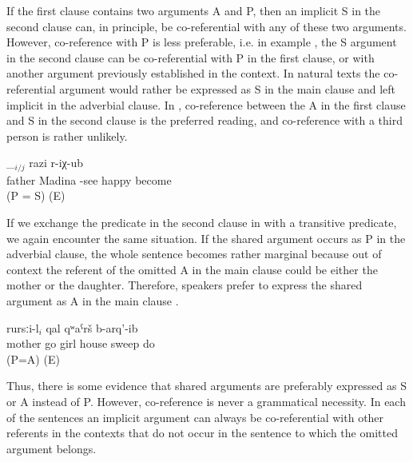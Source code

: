 If the first clause contains two arguments A and P, then an implicit S in the second clause can, in principle, be co-referential with any of these two arguments. However, co-reference with P is less preferable, i.e. in example , the S argument in the second clause can be co-referential with P in the first clause, or with another argument previously established in the context. In natural texts the co-referential argument would rather be expressed as S in the main clause and left implicit in the adverbial clause. In , co-reference between the A in the first clause and S in the second clause is the preferred reading, and co-reference with a third person is rather unlikely. 
%
\begin{exe}
	\ex	\label{ex:Father saw Madina and (she) got happy@40}
		\_$_{i/j}$	razi	r-iχ-ub\\
		father 	Madina	-see		happy	become\\
	\glt	{} (P = S) (E)
\end{exe}

If we exchange the predicate in the second clause in  with a transitive predicate, we again encounter the same situation. If the shared argument occurs as P in the adverbial clause, the whole sentence becomes rather marginal because out of context the referent of the omitted A in the main clause could be either the mother or the daughter. Therefore, speakers prefer to express the shared argument as A in the main clause .
%
 \begin{exe}
	\ex	\label{ex:Mother called her daughter and she swept the house@41}
	\gll	[aba-l	\_$_{i}$ až-aq-ur-re]	rursːi-l$_{i}$	qal	qʷaˁrš b-arq'-ib\\
		mother 	go	girl	house	sweep do\\
	\glt	{} (P=A) (E)
\end{exe}

Thus, there is some evidence that shared arguments are preferably expressed as S or A instead of P. However, co-reference is never a grammatical necessity. In each of the sentences an implicit argument can always be co-referential with other referents in the contexts that do not occur in the sentence to which the omitted argument belongs.

